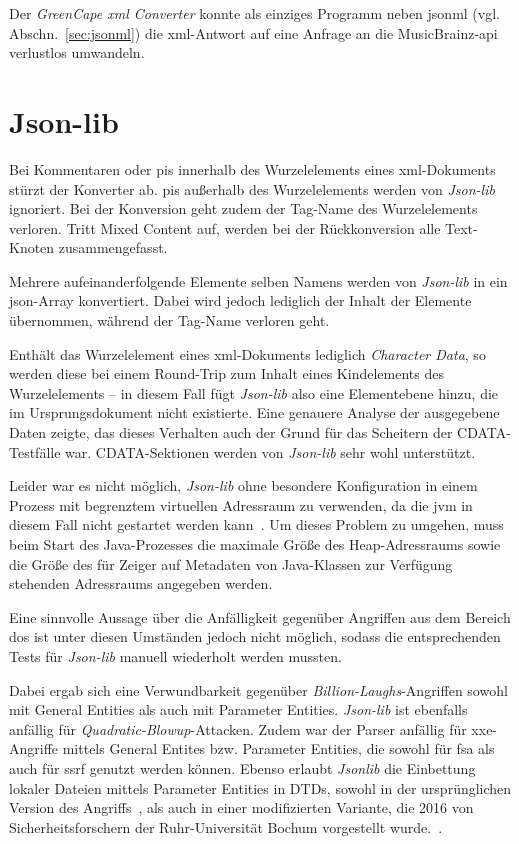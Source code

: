 Der \emph{GreenCape \acrshort{xml} Converter} konnte als einziges Programm neben \acrshort{jsonml} (vgl. Abschn.~\ref{sec:jsonml}) die \acrshort{xml}-Antwort auf eine Anfrage an die MusicBrainz-\acrshort{api} verlustlos umwandeln.

\section{Json-lib}
\label{sec:jsonlib}

Bei Kommentaren oder \glspl{pi} innerhalb des Wurzelelements eines \acrshort{xml}-Dokuments stürzt der Konverter ab. \glspl{pi} außerhalb des Wurzelelements werden von \emph{Json-lib} ignoriert. Bei der Konversion geht zudem der Tag-Name des Wurzelelements verloren. Tritt Mixed Content auf, werden bei der Rückkonversion alle Text-Knoten zusammengefasst.

Mehrere aufeinanderfolgende Elemente selben Namens werden von \emph{Json-lib} in ein \acrshort{json}-Array konvertiert. Dabei wird jedoch lediglich der Inhalt der Elemente übernommen, während der Tag-Name verloren geht.

Enthält das Wurzelelement eines \acrshort{xml}-Dokuments lediglich \emph{Character Data}, so werden diese bei einem Round-Trip zum Inhalt eines Kindelements des Wurzelelements -- in diesem Fall fügt \emph{Json-lib} also eine Elementebene hinzu, die im Ursprungsdokument nicht existierte. Eine genauere Analyse der ausgegebene Daten zeigte, das dieses Verhalten auch der Grund für das Scheitern der CDATA-Testfälle war. CDATA-Sektionen werden von \emph{Json-lib} sehr wohl unterstützt.

Leider war es nicht möglich, \emph{Json-lib} ohne besondere Konfiguration in einem Prozess mit begrenztem virtuellen Adressraum zu verwenden, da die \acrfull{jvm} in diesem Fall nicht gestartet werden kann~\cite{jvmmemlimit}. Um dieses Problem zu umgehen, muss beim Start des Java-Prozesses die maximale Größe des Heap-Adressraums sowie die Größe des für Zeiger auf Metadaten von Java-Klassen zur Verfügung stehenden Adressraums angegeben werden.

Eine sinnvolle Aussage über die Anfälligkeit gegenüber Angriffen aus dem Bereich \acrlong{dos} ist unter diesen Umständen jedoch nicht möglich, sodass die entsprechenden Tests für \emph{Json-lib} manuell wiederholt werden mussten.

Dabei ergab sich eine Verwundbarkeit gegenüber \emph{Billion-Laughs}-Angriffen sowohl mit General Entities als auch mit Parameter Entities. \emph{Json-lib} ist ebenfalls anfällig für \emph{Quadratic\hyp{}Blowup}\hyp{}Attacken. Zudem war der Parser anfällig für \acrshort{xxe}-Angriffe mittels General Entites bzw. Parameter Entities, die sowohl für \acrlong{fsa} als auch für \acrlong{ssrf} genutzt werden können.
Ebenso erlaubt \emph{Jsonlib} die Einbettung lokaler Dateien mittels Parameter Entities in DTDs, sowohl in der ursprünglichen Version des Angriffs~\cite[S.~10]{morgan2014xml}, als auch in einer modifizierten Variante, die 2016 von Sicherheitsforschern der Ruhr-Universität Bochum vorgestellt wurde.~\cite[Abschn.~5.2]{spaeth2016sok}.


